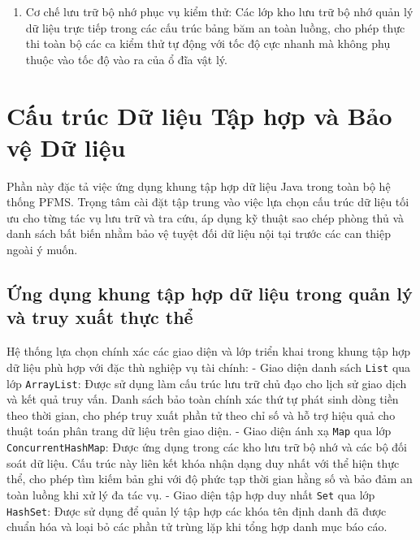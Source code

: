 \documentclass[a4paper,12pt]{report}
\providecommand{\tightlist}{%
  \setlength{\itemsep}{0pt}\setlength{\parskip}{0pt}}
\newcommand{\passthrough}[1]{#1}
\begin{document}
\begin{enumerate}
\def\labelenumi{\arabic{enumi}.}
\setcounter{enumi}{1}
\tightlist
\item
  Cơ chế lưu trữ bộ nhớ phục vụ kiểm thử: Các lớp kho lưu trữ bộ nhớ
  quản lý dữ liệu trực tiếp trong các cấu trúc bảng băm an toàn luồng,
  cho phép thực thi toàn bộ các ca kiểm thử tự động với tốc độ cực nhanh
  mà không phụ thuộc vào tốc độ vào ra của ổ đĩa vật lý.
\end{enumerate}

\chapter{Cấu trúc Dữ liệu Tập hợp và Bảo vệ Dữ
liệu}\label{cux1ea5u-truxfac-dux1eef-liux1ec7u-tux1eadp-hux1ee3p-vuxe0-bux1ea3o-vux1ec7-dux1eef-liux1ec7u}

Phần này đặc tả việc ứng dụng khung tập hợp dữ liệu Java trong toàn bộ
hệ thống PFMS. Trọng tâm cài đặt tập trung vào việc lựa chọn cấu trúc dữ
liệu tối ưu cho từng tác vụ lưu trữ và tra cứu, áp dụng kỹ thuật sao
chép phòng thủ và danh sách bất biến nhằm bảo vệ tuyệt đối dữ liệu nội
tại trước các can thiệp ngoài ý muốn.

\section{Ứng dụng khung tập hợp dữ liệu trong quản lý và truy xuất thực
thể}\label{ux1ee9ng-dux1ee5ng-khung-tux1eadp-hux1ee3p-dux1eef-liux1ec7u-trong-quux1ea3n-luxfd-vuxe0-truy-xuux1ea5t-thux1ef1c-thux1ec3}

Hệ thống lựa chọn chính xác các giao diện và lớp triển khai trong khung
tập hợp dữ liệu phù hợp với đặc thù nghiệp vụ tài chính: - Giao diện
danh sách \passthrough{\lstinline!List!} qua lớp
\passthrough{\lstinline!ArrayList!}: Được sử dụng làm cấu trúc lưu trữ
chủ đạo cho lịch sử giao dịch và kết quả truy vấn. Danh sách bảo toàn
chính xác thứ tự phát sinh dòng tiền theo thời gian, cho phép truy xuất
phần tử theo chỉ số và hỗ trợ hiệu quả cho thuật toán phân trang dữ liệu
trên giao diện. - Giao diện ánh xạ \passthrough{\lstinline!Map!} qua lớp
\passthrough{\lstinline!ConcurrentHashMap!}: Được ứng dụng trong các kho
lưu trữ bộ nhớ và các bộ đối soát dữ liệu. Cấu trúc này liên kết khóa
nhận dạng duy nhất với thể hiện thực thể, cho phép tìm kiếm bản ghi với
độ phức tạp thời gian hằng số và bảo đảm an toàn luồng khi xử lý đa tác
vụ. - Giao diện tập hợp duy nhất \passthrough{\lstinline!Set!} qua lớp
\passthrough{\lstinline!HashSet!}: Được sử dụng để quản lý tập hợp các
khóa tên định danh đã được chuẩn hóa và loại bỏ các phần tử trùng lặp
khi tổng hợp danh mục báo cáo.
\end{document}
